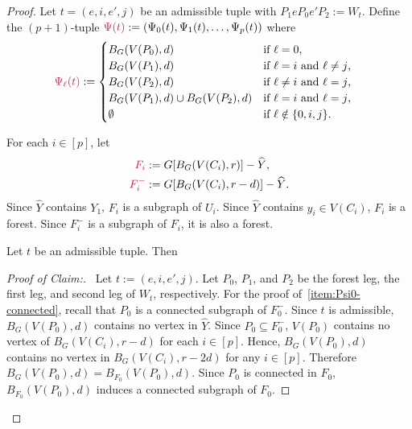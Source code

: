 \documentclass{patmorin}
\newenvironment{clmproof}{\begin{proof}[Proof of Claim:]\renewcommand{\qedsymbol}{\rule{1ex}{1ex}}}{\end{proof}}
\DeclarePairedDelimiter\set{\{}{\}}
\begin{document}
\begin{proof}
  Let $t=(e,i,e',j)$ be an admissible tuple with $P_1eP_0e'P_2:=W_t$. Define the $(p+1)$-tuple $\mathdefin{\Psi(t)}:=(\Psi_0(t),\Psi_1(t),\ldots,\Psi_p(t))$ where
  \begin{align*}
    \mathdefin{\Psi_\ell(t)} &:=
    \begin{cases}
      B_{G}(V(P_0),d) & \textrm{if $\ell=0$,}\\
      B_{G}(V(P_1),d) & \textrm{if $\ell=i$ and $\ell\neq j$,}\\
      B_{G}(V(P_2),d) & \textrm{if $\ell\neq i$ and $\ell= j$,}\\
      B_{G}(V(P_1),d)\cup B_{G}(V(P_2),d) & \textrm{if $\ell= i$ and $\ell= j$,}\\
      \emptyset & \textrm{if $\ell\notin\{0,i,j\}$.}
    \end{cases}
  \end{align*}

  For each $i\in[p]$, let
  \begin{align*}
    \mathdefin{F_i} & := G[B_G(V(C_i),r)]-\widehat{Y},\\
    \mathdefin{F_i^-} & := G[B_G(V(C_i),r-d)]-\widehat{Y}.
  \end{align*}
  Since $\widehat{Y}$ contains $Y_1$, $F_i$ is a subgraph of $U_i$.  Since $\widehat{Y}$ contains $y_i\in V(C_i)$, $F_i$ is a forest.  Since $F^-_i$ is a subgraph of $F_i$, it is also a forest.

  \begin{clm}\label{clm:three-components}
    Let $t$ be an admissible tuple. Then
  \end{clm}

  \begin{clmproof}\
    Let $t:=(e,i,e',j)$. Let $P_0$, $P_1$, and $P_2$ be the forest leg, the first leg, and second leg of $W_t$, respectively.   For the proof of~\cref{item:Psi0-connected}, recall that $P_0$ is a connected subgraph of $F_0^-$. Since $t$ is admissible, $B_G(V(P_0),d)$ contains no vertex in $\widehat{Y}$. Since $P_0\subseteq F_0^-$, $V(P_0)$ contains no vertex of $B_G(V(C_i),r-d)$ for each $i\in[p]$. Hence, $B_G(V(P_0),d)$ contains no vertex in $B_G(V(C_i),r-2d)$ for any $i\in[p]$. Therefore $B_G(V(P_0),d)=B_{F_0}(V(P_0),d)$. Since $P_0$ is connected in $F_0$, $B_{F_0}(V(P_0),d)$ induces a connected subgraph of $F_0$.


\end{clmproof}
\end{proof}
\end{document}
